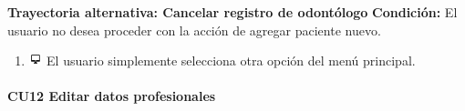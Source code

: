 \textbf{Trayectoria alternativa: Cancelar registro de odontólogo} \bigskip
\vspace{0.3em}
\textbf{Condición:} El usuario no desea proceder con la acción de agregar paciente nuevo.
\begin{enumerate}
\item \includegraphics[height=1em]{pictures/sistema.png} El usuario simplemente selecciona otra opción del menú principal.
\end{enumerate} \bigskip






\paragraph{CU12 Editar datos profesionales}

